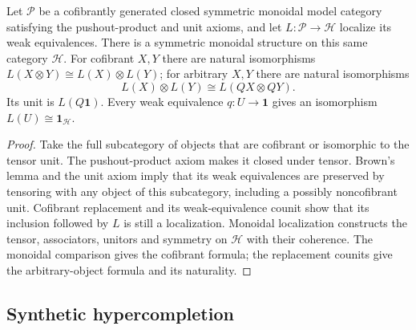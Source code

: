 \begin{theorem}
\label{sem:AdamsSynthetic:model-derived-tensor}
Let $\mathcal P$ be a cofibrantly generated closed symmetric monoidal model
category satisfying the pushout-product and unit axioms, and let
$L\colon\mathcal P\to\mathcal H$ localize its weak equivalences. There is
a symmetric monoidal structure on this same category $\mathcal H$.
For cofibrant $X,Y$ there are natural isomorphisms
$L(X\otimes Y)\cong L(X)\otimes L(Y)$; for arbitrary $X,Y$ there are
natural isomorphisms
\[
 L(X)\otimes L(Y)\cong L(QX\otimes QY).
\]
Its unit is $L(Q\mathbf 1)$. Every weak equivalence
$q\colon U\to\mathbf 1$ gives an isomorphism $L(U)\cong\mathbf 1_{\mathcal H}$.
\end{theorem}
\begin{proof}
Take the full subcategory of objects that are cofibrant or isomorphic
to the tensor unit. The pushout-product axiom makes it closed under
tensor. Brown's lemma and the unit axiom imply that its weak
equivalences are preserved by tensoring with any object of this
subcategory, including a possibly noncofibrant unit. Cofibrant replacement
and its weak-equivalence counit show that its inclusion followed by
$L$ is still a localization. Monoidal localization constructs the tensor,
associators, unitors and symmetry on $\mathcal H$ with their coherence.
The monoidal comparison gives the cofibrant formula; the replacement
counits give the arbitrary-object formula and its naturality.
\end{proof}


\subsection*{Synthetic hypercompletion}

